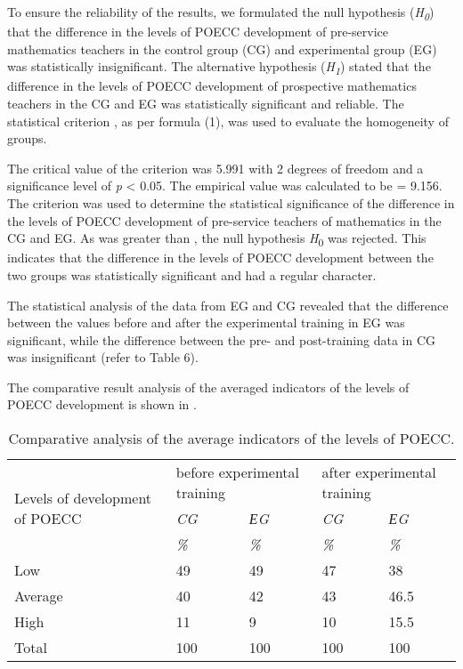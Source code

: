 To ensure the reliability of the results, we formulated the null
hypothesis (\emph{H}\textsubscript{\emph{0}}) that the difference in the
levels of POECC development of pre-service mathematics teachers in the
control group (CG) and experimental group (EG) was statistically
insignificant. The alternative hypothesis
(\emph{H}\textsubscript{\emph{1}}) stated that the difference in the
levels of POECC development of prospective mathematics teachers in the
CG and EG was statistically significant and reliable. The statistical
criterion , as per formula (1), was used to evaluate the homogeneity of
groups.



The critical value of the criterion was 5.991 with 2 degrees of freedom
and a significance level of \emph{p} \textless{} 0.05. The empirical
value was calculated to be = 9.156. The criterion was used to determine
the statistical significance of the difference in the levels of POECC
development of pre-service teachers of mathematics in the CG and EG. As
was greater than , the null hypothesis \emph{H}\textsubscript{0} was
rejected. This indicates that the difference in the levels of POECC
development between the two groups was statistically significant and had
a regular character.



The statistical analysis of the data from EG and CG revealed that the
difference between the values before and after the experimental training
in EG was significant, while the difference between the pre- and
post-training data in CG was insignificant (refer to Table 6).
	
The comparative result analysis of the averaged indicators of the levels of POECC development is shown in .
	
\begin{table}[!htpb]
\centering
\begin{threeparttable}
\caption{Comparative analysis of the average indicators of the levels of POECC.}
\label{tab-05}
\begin{tabular}{l l l l l}
\toprule
\multicolumn{1}{p{3cm}}{\multirow{3}{=}{Levels of development of POECC}} & \multicolumn{2}{p{3cm}}{before experimental training} & \multicolumn{2}{p{3cm}}{after experimental training} \\
& \emph{CG} & \emph{ЕG} & \emph{CG} & \emph{ЕG}  \\
& \emph{\%} & \emph{\%} & \emph{\%} & \emph{\%}  \\
\midrule
Low & 49 & 49 & 47 & 38 \\
Average & 40 & 42 & 43 & 46.5 \\
High & 11 & 9 & 10 & 15.5 \\
Total & 100 & 100 & 100 & 100 \\
\bottomrule
\end{tabular}
\end{threeparttable}
\end{table}
	
